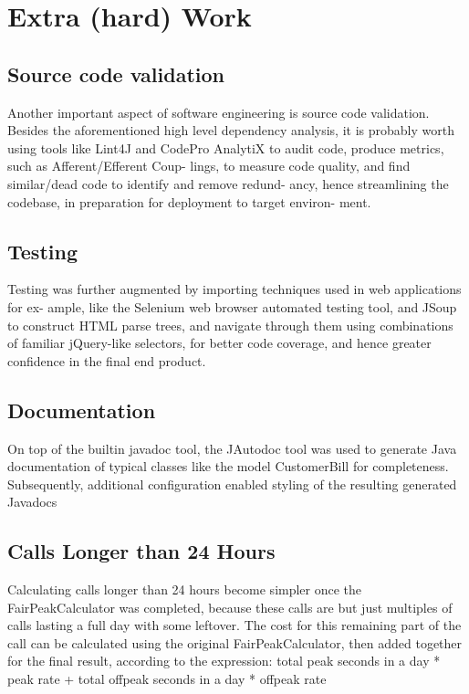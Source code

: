 \documentclass[11pt,twocolumn]{article} %
\begin{document}
\section{Extra (hard) Work}

\subsection{Source code validation}
Another important aspect of software engineering is source code validation. Besides the
aforementioned high level dependency analysis, it is probably worth using tools like Lint4J
and CodePro AnalytiX to audit code, produce metrics, such as Afferent/Efferent Coup-
lings, to measure code quality, and find similar/dead code to identify and remove redund-
ancy, hence streamlining the codebase, in preparation for deployment to target environ-
ment.

\subsection{Testing}
Testing was further augmented by importing techniques used in web applications for ex-
ample, like the Selenium web browser automated testing tool, and JSoup to construct
HTML parse trees, and navigate through them using combinations of familiar jQuery-like
selectors, for better code coverage, and hence greater confidence in the final end product.

\subsection{Documentation}
On top of the builtin javadoc tool, the JAutodoc tool was used to generate Java documentation of typical classes like the model CustomerBill for completeness.
Subsequently, additional configuration enabled styling of the resulting generated Javadocs

\subsection{Calls Longer than 24 Hours}
Calculating calls longer than 24 hours become simpler once the FairPeakCalculator was
completed, because these calls are but just multiples of calls lasting a full day with some
leftover. The cost for this remaining part of the call can be calculated using the original
FairPeakCalculator, then added together for the final result, according to the expression:
total peak seconds in a day * peak rate + total offpeak seconds in a day * offpeak rate
\end{document}
